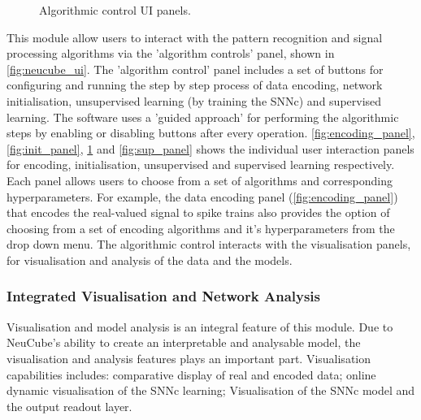 \begin{figure}
{		\label{fig:unsup_panel}}
	\hfil
	\centering
	\caption{Algorithmic control UI panels.}
\end{figure}
This module allow users to interact with the pattern recognition and signal processing algorithms via the ’algorithm controls’ panel, shown in \figurename \ref{fig:neucube_ui}. The ’algorithm control’ panel includes a set of buttons for configuring and running the step by step process of data encoding, network initialisation, unsupervised learning (by training the SNNc) and supervised learning. The software uses a ’guided approach’ for performing the algorithmic steps by enabling or disabling buttons after every operation. \figurenames \ref{fig:encoding_panel}, \ref{fig:init_panel}, \ref{fig:unsup_panel} and \ref{fig:sup_panel} shows the individual user interaction panels for encoding, initialisation, unsupervised and supervised learning respectively. Each panel allows users to choose from a set of algorithms and corresponding hyperparameters. For example, the data encoding panel (\figurename \ref{fig:encoding_panel}) that encodes the real-valued signal to spike trains also provides the option of choosing from a set of encoding algorithms and it’s hyperparameters from the drop down menu. The algorithmic control interacts with the visualisation panels, for visualisation and analysis of the data and the models. 

\subsubsection{Integrated Visualisation and Network Analysis}
\label{subsec:vis}
Visualisation and model analysis is an integral feature of this module. Due to NeuCube's ability to create an interpretable and analysable model, the visualisation and analysis features plays an important part. Visualisation capabilities includes: comparative display of real and encoded data; online dynamic visualisation of the SNNc learning; Visualisation of the SNNc model and the output readout layer.

